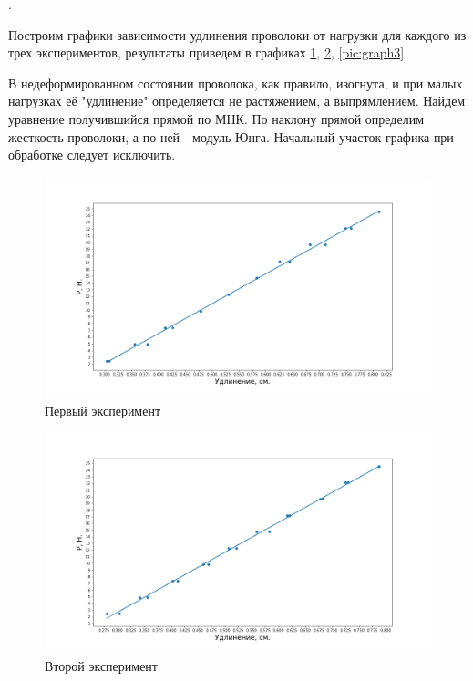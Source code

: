 \documentclass[a4paper, 12pt]{article}
\newcounter{Points}
\newcommand{\point}{\arabic{Points}. \addtocounter{Points}{1}}
\begin{document}
\point Построим графики зависимости удлинения проволоки от нагрузки для каждого из трех экспериментов, результаты приведем в графиках \ref{pic:graph1}, \ref{pic:graph2}, \ref{pic:graph3}

В недеформированном состоянии проволока, как правило, изогнута, и при малых нагрузках её "удлинение" определяется не растяжением, а выпрямлением. Найдем уравнение получившийся прямой по МНК. По наклону прямой определим жесткость проволоки, а по ней - модуль Юнга. Начальный участок графика при обработке следует исключить.

\begin{figure}[!h]
    \centering
    \includegraphics[width=\linewidth]{ex1.png}
    \caption{Первый эксперимент}
    \label{pic:graph1}
\end{figure}

\begin{figure}[!h]
    \centering
    \includegraphics[width=\linewidth]{ex2.png}
    \caption{Второй эксперимент}
    \label{pic:graph2}
\end{figure}
\end{document}
